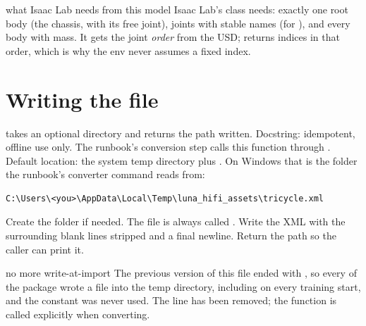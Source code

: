 \begin{isaacbox}{what Isaac Lab needs from this model}
Isaac Lab's  class needs: exactly one root body (the
chassis, with its free joint), joints with stable names (for
), and every body with mass. It gets the joint
\emph{order} from the USD;  returns indices in that order,
which is why the env never assumes a fixed index.
\end{isaacbox}

\section{Writing the file}


\begin{explain}
  takes an optional directory and returns the path
  written.
 Docstring: idempotent, offline use only. The runbook's
  conversion step calls this function through
  .
 Default location: the system temp directory plus
  . On Windows that is the folder the runbook's
  converter command reads from:
\begin{lstlisting}[style=shell]
C:\Users\<you>\AppData\Local\Temp\luna_hifi_assets\tricycle.xml
\end{lstlisting}
 Create the folder if needed.
 The file is always called .
 Write the XML with the surrounding blank lines stripped and a
  final newline.
 Return the path so the caller can print it.
\end{explain}

\begin{whybox}{no more write-at-import}
The previous version of this file ended with
, so every  of the
package wrote a file into the temp directory, including on every training
start, and the constant was never used. The line has been removed; the
function is called explicitly when converting.
\end{whybox}
